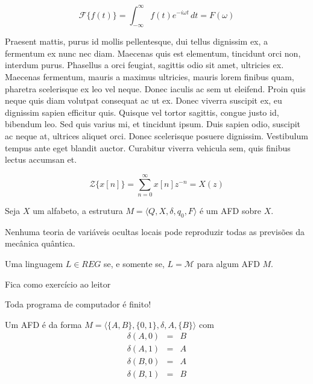 \begin{equation}
  \mathcal{F}\{f(t)\} = \int_{-\infty}^{\infty} f(t) e^{-i \omega t} \, dt = F(\omega)
\end{equation}

Praesent mattis, purus id mollis pellentesque, dui tellus dignissim ex, a fermentum ex nunc nec diam. Maecenas quis est elementum, tincidunt orci non, interdum purus. Phasellus a orci feugiat, sagittis odio sit amet, ultricies ex. Maecenas fermentum, mauris a maximus ultricies, mauris lorem finibus quam, pharetra scelerisque ex leo vel neque. Donec iaculis ac sem ut eleifend. Proin quis neque quis diam volutpat consequat ac ut ex. Donec viverra suscipit ex, eu dignissim sapien efficitur quis. Quisque vel tortor sagittis, congue justo id, bibendum leo. Sed quis varius mi, et tincidunt ipsum. Duis sapien odio, suscipit ac neque at, ultrices aliquet orci. Donec scelerisque posuere dignissim. Vestibulum tempus ante eget blandit auctor. Curabitur viverra vehicula sem, quis finibus lectus accumsan et.

\begin{equation}
  \mathcal{Z}\{x[n]\} = \sum_{n=0}^{\infty} x[n] z^{-n} = X(z)
\end{equation}

\begin{definicao}
  Seja $X$ um alfabeto, a estrutura $M = \langle Q, X, \delta, q_0, F \rangle$ é um AFD sobre $X$.
\end{definicao}

\begin{teorema}
  Nenhuma teoria de variáveis ocultas locais pode reproduzir todas as previsões da mecânica quântica.
\end{teorema}

\begin{lema}
  Uma linguagem $L \in REG$ se, e somente se, $L = \mathcal{M}$ para algum AFD $M$.
\end{lema}

\begin{prova}
  Fica como exercício ao leitor
\end{prova}

\begin{Intuição}
  Toda programa de computador é finito!
\end{Intuição}

\begin{exemplo}
  Um AFD é da forma $M = \langle \{A, B\}, \{0, 1\}, \delta, A, \{B\} \rangle$ com 
  \begin{eqnarray*}
    \delta(A, 0) & = & B\\
    \delta(A, 1) & = & A\\
    \delta(B, 0) & = & A\\
    \delta(B, 1) & = & B\\
  \end{eqnarray*}
\end{exemplo}